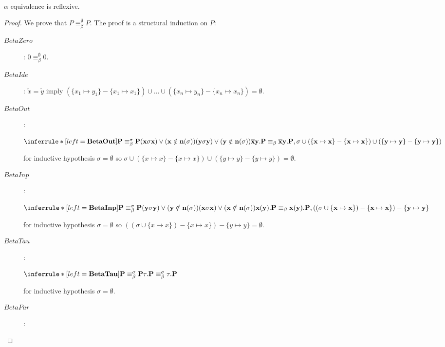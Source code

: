 \begin{lemma}\label{alphaEquivalenceIsReflexive}
  $\alpha$ equivalence is reflexive.
  \begin{proof}
    We prove that $P\equiv_{\beta}^{\emptyset} P$. The proof is a structural induction on $P$:
    \begin{description}
      \item[$BetaZero$]: 
	$0\equiv_{\beta}^{\emptyset}0$.
      \item[$BetaIde$]: 
	$\tilde{x}=\tilde{y}$ imply $(\{x_{1}\mapsto y_{1}\}-\{x_{1}\mapsto x_{1}\}) \cup \ldots \cup (\{x_{n}\mapsto y_{n}\}-\{x_{n}\mapsto x_{n}\})=\emptyset$.
      \item[$BetaOut$]:
	\begin{center}
	  $\inferrule*[left=\bf{BetaOut}]{
	      P\equiv_{\beta}^{\sigma}P
	    \\
	      (x\sigma x) \vee (x\notin n(\sigma))
	    \\
	      (y\sigma y) \vee (y\notin n(\sigma))
	  }{
	      \overline{x}y.P\equiv_{\beta}\overline{x}y.P,
	    \\
	      \sigma \cup (\{x\mapsto x\}-\{x\mapsto x\}) \cup (\{y\mapsto y\}-\{y\mapsto y\})
	  }$
	\end{center}
	for inductive hypothesis $\sigma=\emptyset$ so $\sigma \cup (\{x\mapsto x\}-\{x\mapsto x\}) \cup (\{y\mapsto y\}-\{y\mapsto y\})=\emptyset$.
      \item[$BetaInp$]:
	\begin{center}
	  $\inferrule*[left=\bf{BetaInp}]{
	      P\equiv_{\beta}^{\sigma}P
	    \\
	      (y\sigma y) \vee (y\notin n(\sigma))
	    \\
	      (x\sigma x) \vee (x\notin n(\sigma))
	  }{
	      x(y).P\equiv_{\beta}x(y).P,
	    \\
	      ((\sigma \cup \{x\mapsto x\})-\{x\mapsto x\})- \{y\mapsto y\}
	  }$
	\end{center}
	for inductive hypothesis $\sigma=\emptyset$ so $((\sigma \cup \{x\mapsto x\})-\{x\mapsto x\})- \{y\mapsto y\}=\emptyset$.
      \item[$BetaTau$]:
	\begin{center}
	  $\inferrule*[left=\bf{BetaTau}]{
	      P\equiv_{\beta}^{\sigma}P
	  }{
	      \tau.P\equiv_{\beta}^{\sigma}\tau.P
	  }$
	\end{center}
	for inductive hypothesis $\sigma=\emptyset$.
      \item[$BetaPar$]:
	\begin{center}

\end{center}
\end{description}
\end{proof}
\end{lemma}
